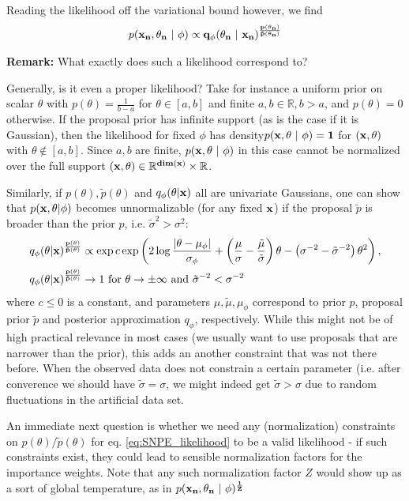 \documentclass[10pt,english]{article}
\begin{document}
Reading the likelihood off the variational bound however, we find
\begin{align}
p( \bf{x}_n, \theta_n \ | \ \phi) \propto q_\phi(\theta_n \ | \ \bf{x}_n)^\frac{p(\theta_n)}{\tilde{p}(\theta_n)}
\label{eq:SNPE_likelihood}
\end{align}

\begin{framed}
\noindent{}\textbf{Remark:} What exactly does such a likelihood correspond to? 

Generally, is it even a proper likelihood? 
Take for instance a uniform prior on scalar $\theta$ with $p(\theta) = \frac{1}{b-a}$ for $\theta \in [a,b]$ and finite $a,b\in\mathbb{R}, b>a$, and $p(\theta) = 0$ otherwise. 
If the proposal prior has infinite support (as is the case if it is Gaussian), then the likelihood for fixed $\phi$ has density$p(\bf{x}, \theta \ | \ \phi) = 1$
for $(\bf{x}, \theta)$ with $\theta \notin [a,b]$.
Since $a,b$ are finite, $p(\bf{x}, \theta \ | \ \phi)$ in this case cannot be normalized over the full support $(\bf{x}, \theta) \in \mathbb{R}^{dim(\bf{x})} \times \mathbb{R}$. 

Similarly, if $p(\theta), \tilde{p}(\theta)$ and $q_\phi(\theta|\bf{x})$ all are univariate Gaussians, one can show that $p(\bf{x},\theta | \phi)$ becomes unnormalizable (for any fixed $\bf{x}$) if the proposal $\tilde{p}$ is broader than the prior $p$, i.e. $\tilde{\sigma}^2 > \sigma^2$:
\begin{align}
q_\phi(\theta | \bf{x})^\frac{p(\theta)}{\tilde{p}(\theta)} &\propto \exp c \exp \left( 2 \log \frac{|\theta - \mu_{\phi}|}{\sigma_{\phi}} + \left(\frac{\mu}{\sigma} - \frac{\tilde{\mu}}{\tilde{\sigma}}\right) \theta - \left(\sigma^{-2} - \tilde{\sigma}^{-2} \right) \theta^2 \right) \nonumber, \\
q_\phi(\theta | \bf{x})^\frac{p(\theta)}{\tilde{p}(\theta)} &\rightarrow 1 \mbox{ for } \theta \rightarrow \pm \infty \nonumber \mbox{ and } \tilde{\sigma}^{-2} < \sigma^{-2}
\end{align}
where $c \leq 0$ is a constant, and parameters $\mu, \tilde{\mu}, \mu_\phi$ correspond to prior $p$, proposal prior $\tilde{p}$ and posterior approximation $q_\phi$, respectively.
While this might not be of high practical relevance in most cases (we usually want to use proposals that are narrower than the prior), this adds an another constraint that was not there before. 
When the observed data does not constrain a certain parameter (i.e. after converence we should have $\tilde{\sigma} = \sigma$, we might indeed get $\tilde{\sigma} > \sigma$ due to random fluctuations in the artificial data set.

An immediate next question is whether we need any (normalization) constraints on $p(\theta)/\tilde{p}(\theta)$ for eq. \ref{eq:SNPE_likelihood} to be a valid likelihood - if such constraints exist, they could lead to sensible normalization factors for the importance weights. 
Note that any such normalization factor $Z$ would show up as a sort of global temperature, as in $p( \bf{x}_n, \theta_n \ | \ \phi)^{\frac{1}{Z}}$
\end{framed}
\end{document}
